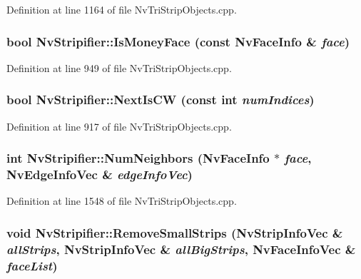 Definition at line 1164 of file NvTriStripObjects.cpp.\hypertarget{class_nv_stripifier_e7399bc8bac9ee4cfbf17623f9c6c2b7}{
\subsubsection[{IsMoneyFace}]{\setlength{\rightskip}{0pt plus 5cm}bool NvStripifier::IsMoneyFace (const {\bf NvFaceInfo} \& {\em face})}}
\label{class_nv_stripifier_e7399bc8bac9ee4cfbf17623f9c6c2b7}




Definition at line 949 of file NvTriStripObjects.cpp.\hypertarget{class_nv_stripifier_a3bf53ccf3e03e6b4cfd0746f708bd60}{
\subsubsection[{NextIsCW}]{\setlength{\rightskip}{0pt plus 5cm}bool NvStripifier::NextIsCW (const int {\em numIndices})}}
\label{class_nv_stripifier_a3bf53ccf3e03e6b4cfd0746f708bd60}




Definition at line 917 of file NvTriStripObjects.cpp.\hypertarget{class_nv_stripifier_38f2f9e8caf2c33ef6b61bfa65012762}{
\subsubsection[{NumNeighbors}]{\setlength{\rightskip}{0pt plus 5cm}int NvStripifier::NumNeighbors ({\bf NvFaceInfo} $\ast$ {\em face}, \/  {\bf NvEdgeInfoVec} \& {\em edgeInfoVec})}}
\label{class_nv_stripifier_38f2f9e8caf2c33ef6b61bfa65012762}




Definition at line 1548 of file NvTriStripObjects.cpp.\hypertarget{class_nv_stripifier_12373863311286b3dfc078018acdbc5c}{
\subsubsection[{RemoveSmallStrips}]{\setlength{\rightskip}{0pt plus 5cm}void NvStripifier::RemoveSmallStrips ({\bf NvStripInfoVec} \& {\em allStrips}, \/  {\bf NvStripInfoVec} \& {\em allBigStrips}, \/  {\bf NvFaceInfoVec} \& {\em faceList})}}
\label{class_nv_stripifier_12373863311286b3dfc078018acdbc5c}





